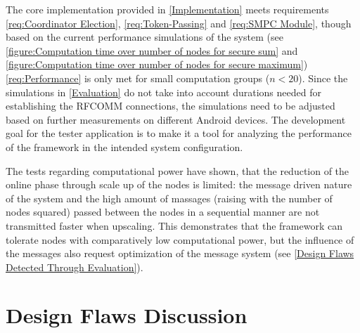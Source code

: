 The core implementation provided in \autoref{Implementation} meets requirements \ref{req:Coordinator Election}, \ref{req:Token-Passing} and \ref{req:SMPC Module}, though based on the current performance simulations of the system (see \autoref{figure:Computation time over number of nodes for secure sum} and \autoref{figure:Computation time over number of nodes for secure maximum}) \ref{req:Performance} is only met for small computation groups ($n<20$). Since the simulations in \autoref{Evaluation} do not take into account durations needed for establishing the \gls{RFCOMM} connections, the simulations need to be adjusted based on further measurements on different Android devices. The development goal for the tester application is to make it a tool for analyzing the performance of the framework in the intended system configuration.

The tests regarding computational power have shown, that the reduction of the online phase through scale up of the nodes is limited: the message driven nature of the system and the high amount of massages (raising with the number of nodes squared) passed between the nodes in a sequential manner are not transmitted faster when upscaling. This demonstrates that the framework can tolerate nodes with comparatively low computational power, but the influence of the messages also request optimization of the message system (see \autoref{Design Flaws Detected Through Evaluation}).

\section{Design Flaws Discussion} \label{Design Flaws Detected Through Evaluation}

